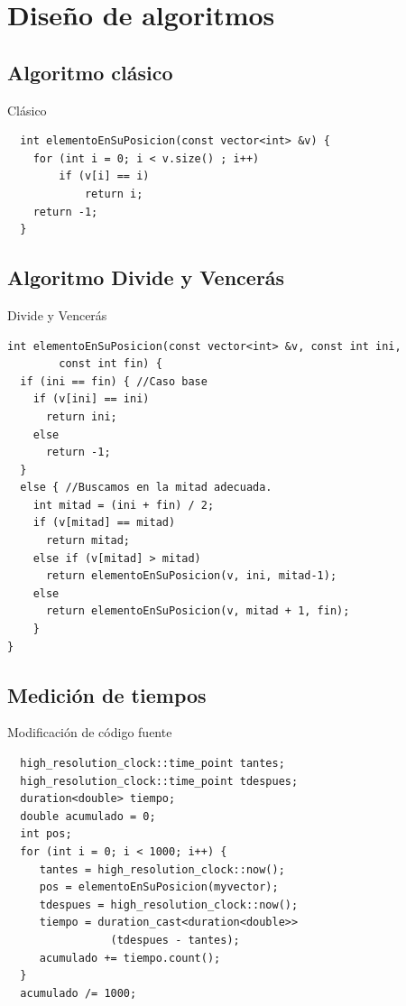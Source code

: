 \documentclass{beamer}
\begin{document}
\section{Diseño de algoritmos}

\subsection{Algoritmo clásico}

\begin{frame}[fragile]{Clásico}
\begin{verbatim}
  int elementoEnSuPosicion(const vector<int> &v) {
  	for (int i = 0; i < v.size() ; i++)
  		if (v[i] == i)
			return i;
	return -1;
  }
\end{verbatim}  
\end{frame}

\subsection{Algoritmo Divide y Vencerás}

\begin{frame}[fragile]{Divide y Vencerás}
\begin{verbatim}
int elementoEnSuPosicion(const vector<int> &v, const int ini, 
		const int fin) {
  if (ini == fin) {	//Caso base
    if (v[ini] == ini)
      return ini;
    else
      return -1;
  }
  else { //Buscamos en la mitad adecuada.
    int mitad = (ini + fin) / 2;
    if (v[mitad] == mitad)
      return mitad;
    else if (v[mitad] > mitad)
      return elementoEnSuPosicion(v, ini, mitad-1);
    else
      return elementoEnSuPosicion(v, mitad + 1, fin);
    }
}	
\end{verbatim}  
\end{frame}

\subsection{Medición de tiempos}

\begin{frame}[fragile]{Modificación de código fuente}
\begin{verbatim}
  high_resolution_clock::time_point tantes;
  high_resolution_clock::time_point tdespues;
  duration<double> tiempo;
  double acumulado = 0;
  int pos;
  for (int i = 0; i < 1000; i++) {
	 tantes = high_resolution_clock::now();
	 pos = elementoEnSuPosicion(myvector);
	 tdespues = high_resolution_clock::now();
	 tiempo = duration_cast<duration<double>>
	 	        (tdespues - tantes);
	 acumulado += tiempo.count();
  }
  acumulado /= 1000;
\end{verbatim}
\end{frame}
\end{document}
